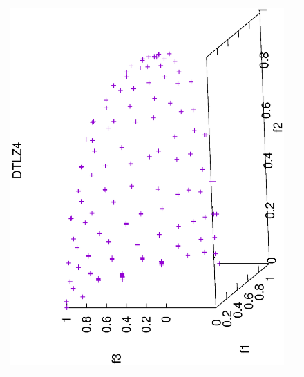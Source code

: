\begin{figure}[H]
\begin{tabular}{cc}
 \includegraphics[scale=0.3, angle=-90,origin=c]{Figures_Chapter7/Results_Chapter4/Summary_Representative/VSD-MOEA-D/DTLZ4.eps} \\

\end{tabular}
\end{figure}

